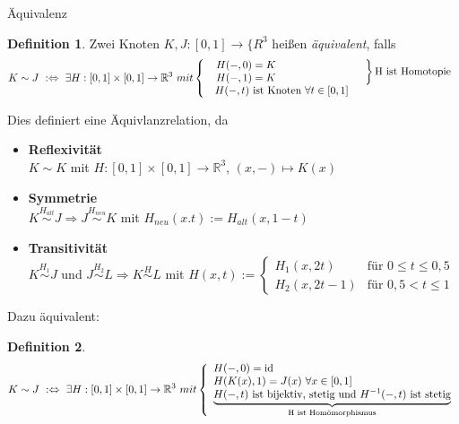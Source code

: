\documentclass[a4paper,pagesizefontsize=12pt]{scrartcl}
\newcommand\R{\mathbb{R}}
\theoremstyle{definition}
\newtheorem{defi}{Definition}
\theoremstyle{remark}
\begin{document}
\begin{section}{Äquivalenz}
\begin{defi}
Zwei Knoten $K,J : [0,1]\longrightarrow \{R^3$ heißen \textit{äquivalent}, falls
\begin{displaymath}
K\sim J\ :\Leftrightarrow \ \exists H : [0,1] \times [0,1] \rightarrow \R^3\ mit \\
\left\{\begin{array}{l} \left. \begin{array}{l}
H(-,0) = K\qquad \qquad \qquad\qquad \\
H(-,1)=K\\
\end{array} \right\} \text{H ist Homotopie}
\\ \, \   H(-,t)\text{ ist Knoten}\ \forall t \in[0,1]
\end{array}\right.
\end{displaymath}
\end{defi}

Dies definiert eine Äquivlanzrelation, da
\begin{itemize}
\item \textbf{Reflexivität}
\\ $K\sim K$ mit $H:[0,1]\times [0,1] \longrightarrow \R^3$, $(x,-) \mapsto K(x)$
\item \textbf{Symmetrie}
\\ $K\stackrel{H_{alt}}{\sim}J \Rightarrow J\stackrel{H_{neu}}{\sim}K$ \qquad mit $H_{neu}(x.t) := H_{alt}(x,1-t)$
\item \textbf{Transitivität}
\\ $K\stackrel{H_{1}}{\sim}J$ und $J\stackrel{H_{2}}{\sim}L \Rightarrow K\stackrel{H}{\sim}L$ \qquad mit $H(x,t) :=
\begin{cases} 
H_1(x,2t) &\mbox{für } 0\leq t \leq 0,5
\\H_2(x,2t-1) & \mbox{für } 0,5 < t \leq 1
\end{cases} $
\end{itemize}

Dazu äquivalent:
\begin{defi}
\begin{displaymath}
K\sim J\ :\Leftrightarrow \ \exists H : [0,1] \times [0,1] \rightarrow \R^3\ mit \\
\left\{\begin{array}{l} 
H(-,0) = \mathrm{id} \\
H(K(x),1)=J(x)\ \forall x\in [0,1]\\
\underbrace{H(-,t)\text{ ist bijektiv, stetig und }H^{-1}(-,t) \text{ ist stetig}}_{\text{H ist Homömorphismus}}
\end{array}\right.
\end{displaymath}
\end{defi}


\end{section}
\end{document}
